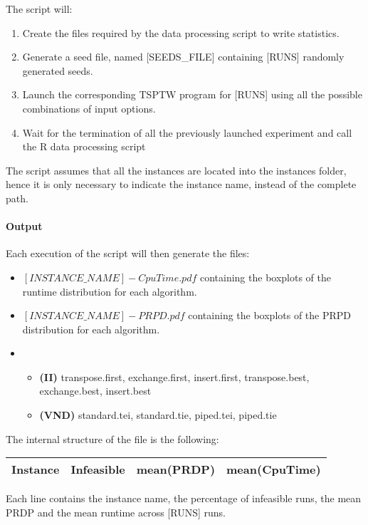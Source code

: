 \documentclass{article}
\begin{document}
The script will:
\begin{enumerate}
  \item Create the files required by the data processing script to write statistics.
  \item Generate a seed file, named [SEEDS\_FILE] containing [RUNS] randomly generated seeds.
  \item Launch the corresponding TSPTW program for [RUNS]  using all the possible combinations of input options.
  \item Wait for the termination of all the previously launched experiment and call the R data processing script
\end{enumerate}

The script assumes that all the instances are located into the instances folder, hence it is only necessary to indicate the instance name, instead of the complete path.

\paragraph{Output}

Each execution of the script will then generate the files:
\begin{itemize}
  \item $[INSTANCE\_NAME]-CpuTime.pdf$ containing the boxplots of the runtime distribution for each algorithm.
  \item $[INSTANCE\_NAME]-PRPD.pdf$ containing the boxplots of the PRPD distribution for each algorithm.
  \item 
        \begin{itemize}
          \item \textbf{(II)} transpose.first, exchange.first, insert.first, transpose.best, exchange.best, insert.best 
          \item \textbf{(VND)} standard.tei, standard.tie, piped.tei, piped.tie
        \end{itemize}
\end{itemize}

The internal structure of the file is the following:
 
\begin{tabular}{|c|c|c|c|}
\hline
\textbf{Instance}	&	\textbf{Infeasible} & \textbf{mean(PRDP)} &	\textbf{mean(CpuTime)} \\ \hline
\end{tabular}

Each line contains the instance name, the percentage of infeasible runs, the mean PRDP and the mean runtime across [RUNS] runs.
\end{document}
